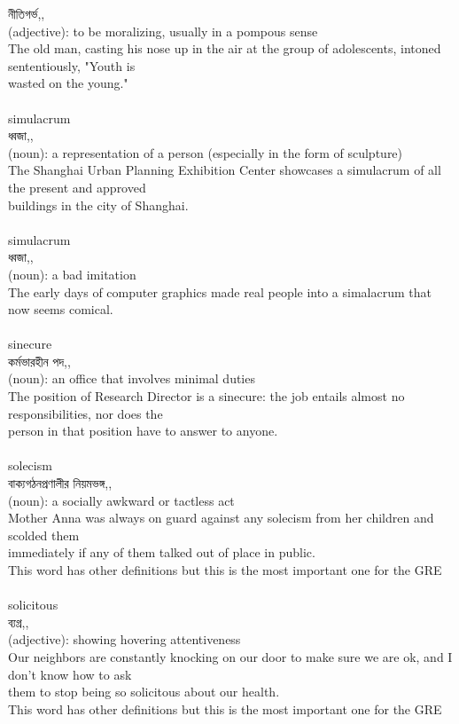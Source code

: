 \documentclass{article}
\begin{document}
{{নীতিগর্ভ,,}\\
{(adjective): to be moralizing, usually in a pompous sense\\The old man, casting his nose up in the air at the group of adolescents, intoned sententiously, "Youth is\\wasted on the young."\\}\\
{simulacrum}\\
{ধ্বজা,,}\\
{(noun): a representation of a person (especially in the form of sculpture)\\The Shanghai Urban Planning Exhibition Center showcases a simulacrum of all the present and approved\\buildings in the city of Shanghai.\\}\\
{simulacrum}\\
{ধ্বজা,,}\\
{(noun): a bad imitation\\The early days of computer graphics made real people into a simalacrum that now seems comical.\\}\\
{sinecure}\\
{কর্মভারহীন পদ,,}\\
{(noun): an office that involves minimal duties\\The position of Research Director is a sinecure: the job entails almost no responsibilities, nor does the\\person in that position have to answer to anyone.\\}\\
{solecism}\\
{বাক্যগঠনপ্রণালীর নিয়মভঙ্গ,,}\\
{(noun): a socially awkward or tactless act\\Mother Anna was always on guard against any solecism from her children and scolded them\\immediately if any of them talked out of place in public.\\This word has other definitions but this is the most important one for the GRE\\}\\
{solicitous}\\
{ব্যগ্র,,}\\
{(adjective): showing hovering attentiveness\\Our neighbors are constantly knocking on our door to make sure we are ok, and I don't know how to ask\\them to stop being so solicitous about our health.\\This word has other definitions but this is the most important one for the GRE\\}\\
}
\end{document}
